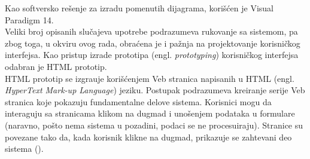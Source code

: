 Kao softversko re\v senje za izradu pomenutih dijagrama, kori\v s\' cen je Visual Paradigm 14.\\

Veliki broj opisanih slu\v cajeva upotrebe podrazumeva rukovanje sa sistemom, pa zbog toga, u okviru ovog rada, obra\' cena je i pa\v znja na projektovanje korisni\v ckog interfejsa. Kao pristup izrade prototipa (engl. \textit{prototyping}) korisni\v ckog interfejsa odabran je HTML prototip.\\

HTML prototip se izgra\dj uje kori\v s\'cenjem Veb stranica napisanih u HTML (engl. \textit{HyperText Mark-up Language}) jeziku. Postupak podrazumeva kreiranje serije Veb stranica koje pokazuju fundamentalne delove sistema. Korisnici mogu da interaguju sa stranicama klikom na dugmad i uno\v senjem podataka u formulare (naravno, po\v sto nema sistema u pozadini, podaci se ne procesuiraju). Stranice su povezane tako da, kada korisnik klikne na dugmad, prikazuje se zahtevani deo sistema (\cite{SAAD}).

